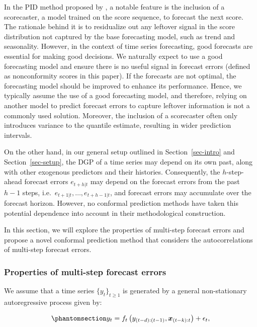 \documentclass[
  11pt,
  a4paper,
]{article}
\theoremstyle{plain}
\theoremstyle{plain}
\theoremstyle{remark}
\begin{document}
In the PID method proposed by \textcite{angelopoulos2024}, a notable
feature is the inclusion of a scorecaster, a model trained on the score
sequence, to forecast the next score. The rationale behind it is to
residualize out any leftover signal in the score distribution not
captured by the base forecasting model, such as trend and seasonality.
However, in the context of time series forecasting, good forecasts are
essential for making good decisions. We naturally expect to use a good
forecasting model and ensure there is no useful signal in forecast
errors (defined as nonconformity scores in this paper). If the forecasts
are not optimal, the forecasting model should be improved to enhance its
performance. Hence, we typically assume the use of a good forecasting
model, and therefore, relying on another model to predict forecast
errors to capture leftover information is not a commonly used solution.
Moreover, the inclusion of a scorecaster often only introduces variance
to the quantile estimate, resulting in wider prediction intervals.

On the other hand, in our general setup outlined in
Section~\ref{sec-intro} and Section~\ref{sec-setup}, the DGP of a time
series may depend on its own past, along with other exogenous predictors
and their histories. Consequently, the \(h\)-step-ahead forecast errors
\(e_{t+h|t}\) may depend on the forecast errors from the past \(h-1\)
steps, i.e.~\(e_{t+1|t}, \ldots, e_{t+h-1|t}\), and forecast errors may
accumulate over the forecast horizon. However, no conformal prediction
methods have taken this potential dependence into account in their
methodological construction.

In this section, we will explore the properties of multi-step forecast
errors and propose a novel conformal prediction method that considers
the autocorrelations of multi-step forecast errors.

\subsubsection{Properties of multi-step forecast errors}\label{sec-ppt}

We assume that a time series \(\{y_t\}_{t \geq 1}\) is generated by a
general non-stationary autoregressive process given by:

\begin{equation}\phantomsection\label{eq-dgp}{
y_t = f_{t}\left(y_{(t-d):(t-1)},\bm{x}_{(t-k):t}\right) + \epsilon_t,
}\end{equation}
\end{document}
